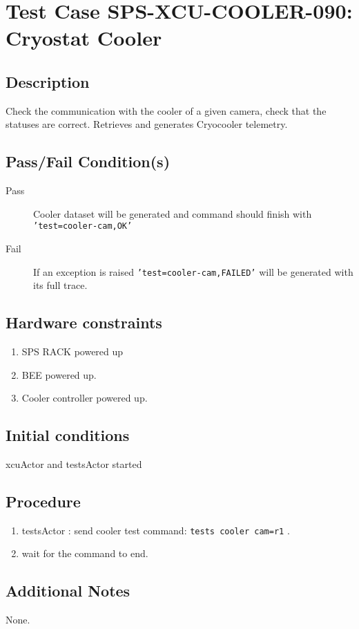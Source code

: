 \section{Test Case SPS-XCU-COOLER-090: Cryostat Cooler}

\subsection{Description}

Check the communication with the cooler of a given camera, check that the statuses are correct.
Retrieves and generates Cryocooler telemetry.

\subsection{Pass/Fail Condition(s)}

\begin{description}
\item [Pass] Cooler dataset will be generated and command should finish with \texttt{'test=cooler-cam,OK'}
\item [Fail] If an exception is raised \texttt{'test=cooler-cam,FAILED'} will be generated with its full trace.

\end{description}

\subsection{Hardware constraints}

\begin{enumerate}
    \item SPS RACK powered up
    \item BEE powered up.
    \item Cooler controller powered up.
\end{enumerate}

\subsection{Initial conditions}

xcuActor and testsActor started

\subsection{Procedure}

\begin{enumerate}
    \item testsActor : send cooler test command: \texttt{tests cooler cam=r1} .
    \item wait for the command to end.
\end{enumerate}

\subsection{Additional Notes}
None.

